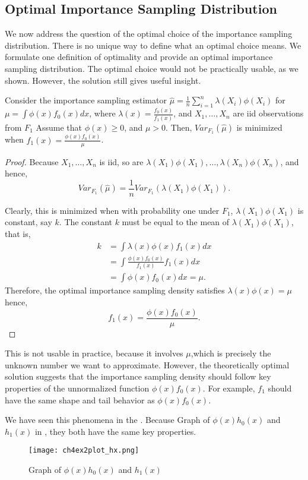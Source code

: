 \subsection{Optimal Importance Sampling Distribution}
We now address the question of the optimal choice of the importance sampling
distribution. There is no unique way to define what an optimal choice means. We
formulate one definition of optimality and provide an optimal importance sampling
distribution. The optimal choice would not be practically usable, as we shown.
However, the solution still gives useful insight.

\begin{theorem}
	Consider the importance sampling estimator $\hat{\mu} = \frac{1}{n}\sum_{i=1}^{n} \lambda(X_i)\phi(X_i) $ for $\mu=\int \phi(x)f_0(x)dx $, where
	$\lambda(x) =\frac{f_0(x)}{f_1(x)}$, and $X_1,\ldots,X_n$ are iid observations from $F_1$
	Assume that $\phi(x)\ge0$, and $\mu>0$. Then, $Var_{F_1}(\hat{\mu})$ is
	minimized when $f_1(x)=\frac{\phi(x)f_0(x)}{\mu}$.
\end{theorem}
\begin{proof}
	Because $X_1,\ldots,X_n$ is iid, so are $\lambda(X_1)\phi(X_1),\ldots,\lambda(X_n)\phi(X_n)$, and hence,
	\[
		Var_{F_1}(\hat{\mu}) = \frac{1}{n} Var_{F_1}(\lambda(X_1)\phi(X_1))
		.
	\]

	Clearly, this is minimized when with probability one under $F_1$, $\lambda(X_1)\phi(X_1)$
	is constant, say $k$. The constant $k$ must be equal to the mean of $\lambda(X_1)\phi(X_1)$, that is,
	\begin{align*}
		k & = \int \lambda(x)\phi(x)f_1(x)dx              \\
		  & = \int \frac{\phi(x)f_0(x)}{f_1(x)} f_1(x) dx \\
		  & = \int \phi(x)f_0(x)dx = \mu.
	\end{align*}
	Therefore, the optimal importance sampling density satisfies $\lambda(x)\phi(x) = \mu$
	hence,
	\[
		f_1(x) = \frac{\phi(x)f_0(x)}{\mu}.
	\]
\end{proof}
This is not usable in practice, because it involves $\mu$,which is precisely the unknown number we want to approximate.
However, the theoretically optimal solution
suggests that the importance sampling density should follow key properties of the
unnormalized function $\phi(x)f_0(x)$.
For example, $f_1$ should have the same shape and tail behavior as $\phi(x)f_0(x)$.

We have seen this phenomena in the .
Because Graph of $\phi(x)h_0(x)$ and $h_1(x)$ in , they both have the same key properties.   
\begin{figure}[H]
    \centering
    \texttt{[image: ch4ex2plot\_hx.png]}
    \caption{Graph of $\phi(x)h_0(x)$ and $h_1(x)$}
    \label{fig:ch4ex2plothx}
\end{figure}
